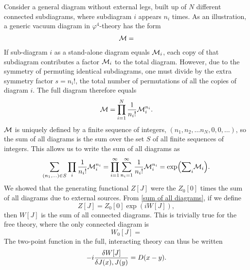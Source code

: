 Consider a general diagram without external legs, built up of $N$ different connected subdiagrams, where subdiagram $i$ appears $n_i$ times.
As an illustration, a generic vacuum diagram in $\varphi^4$-theory has the form
\begin{align}
    \label{Feynman diagrams}
    \mathcal{M} = 
\end{align}
If sub-diagram $i$ as a stand-alone diagram equals $\mathcal{M}_i$, each copy of that subdiagram contributes a factor $\mathcal{M}_i$ to the total diagram.
However, due to the symmetry of permuting identical subdiagrams, one must divide by the extra symmetry factor $s = n_i !$, the total number of permutations of all the copies of diagram $i$.
The full diagram therefore equals
\begin{align}
    \mathcal{M}
    = \prod_{i= 1}^N \frac{1}{n_i!} \mathcal{M}_i^{n_i}.
\end{align}
$\mathcal{M}$ is uniquely defined by a finite sequence of integers, $(n_1, n_2, \dots n_N, 0, 0, \dots)$, so the sum of all diagrams is the sum over the set $S$ of all finite sequences of integers.
This allows us to write the sum of all diagrams as
\begin{equation}
    \label{sum of all diagrams}
    \sum_{(n_1, ...)\in S} \prod_{i} \frac{1}{n_i!} \mathcal{M}_i^{n_i}
    = \prod_{i = 1}^{\infty} \sum_{n_i=1}^{\infty} \frac{1}{n_i!} \mathcal{M}_i^{n_i}
    = \exp({\sum}_i \mathcal{M}_i).
\end{equation}
We showed that the generating functional $Z[J]$ were the $Z_0[0]$ times the sum of all diagrams due to external sources.
From \autoref{sum of all diagrams}, if we define
\begin{equation}
    Z[J] = Z_0[0]\exp(i W[J]),
\end{equation}
then $W[J]$ is the sum of all connected diagrams. This is trivially true for the free theory, where the only connected diagram is
\begin{equation}
    \label{generating functional of connected diagrams}
    W_0[J] = 
\end{equation}
The two-point function in the full, interacting theory can thus be written
\begin{equation}
    -i \fdv{W[J]}{J(x),J(y)} = D(x - y).
\end{equation}
